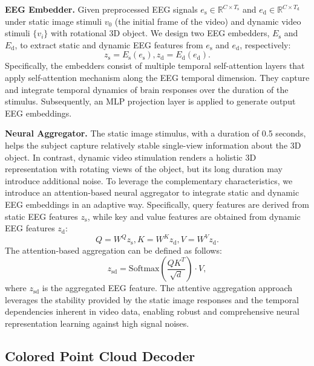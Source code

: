 {\textbf{EEG Embedder.}}
Given preprocessed EEG signals $e_\mathrm{s}\in \mathbb{R}^{C\times T_\mathrm{s}}$ and $e_\mathrm{d}\in \mathbb{R}^{C\times T_\mathrm{d}}$ under static image stimuli $v_0$ (the initial frame of the video) and dynamic video stimuli $\{v_i\}$ with rotational 3D object.
We design two EEG embedders, $E_\mathrm{s}$ and $E_\mathrm{d}$, to extract static and dynamic EEG features from $e_\mathrm{s}$ and $e_\mathrm{d}$, respectively:
\begin{equation}
	z_\mathrm{s}=E_\mathrm{s}(e_\mathrm{s}), z_\mathrm{d}=E_\mathrm{d}(e_\mathrm{d}).
\end{equation}
Specifically,
the embedders consist of multiple temporal self-attention layers 
that apply self-attention \cite{vaswani2017attention} mechanism along the EEG temporal dimension.
They capture and integrate temporal dynamics of brain responses over the duration of the stimulus.
Subsequently, an MLP projection layer is applied to generate output EEG embeddings. 

\textbf{Neural Aggregator.}
The static image stimulus, with a duration of 0.5 seconds, helps the subject capture relatively stable single-view information about the 3D object. 
In contrast, dynamic video stimulation renders a holistic 3D representation with rotating views of the object, but its long duration may introduce additional noise.
To leverage the complementary characteristics, 
we introduce an attention-based neural aggregator to integrate static and dynamic EEG embeddings in an adaptive way. Specifically, query features are derived from static EEG features $z_{\mathrm{s}}$, while key and value features are obtained from dynamic EEG features $z_{\mathrm{d}}$:
\begin{equation}
	Q=W^Qz_\mathrm{s}, K=W^Kz_\mathrm{d}, V=W^Vz_\mathrm{d}.
\end{equation}
The attention-based aggregation can be defined as follows:  
\begin{equation}
	z_{\mathrm{sd}}=\mathrm{Softmax}(\frac{QK^T}{\sqrt{d}})\cdot V,
\end{equation}
where $z_{\mathrm{sd}}$ is the aggregated EEG feature.
The attentive aggregation approach leverages the stability provided by the static image responses and the temporal dependencies inherent in video data, enabling robust and comprehensive neural representation learning against high signal noises.

\subsection{Colored Point Cloud Decoder}

